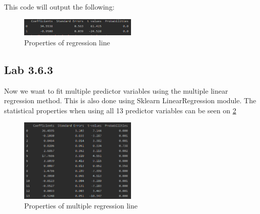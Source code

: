 This code will output the following:

\begin{figure}[H]
	\centering
	\includegraphics[width=0.5\textwidth]{Img/lab1_output.PNG}
	\caption{Properties of regression line}
	\label{fig:lab1_1}
\end{figure} 



\subsection{Lab 3.6.3}
Now we want to fit multiple predictor variables using the multiple linear regression method. This is also done using Sklearn LinearRegression module. The statistical properties when using all 13 predictor variables can be seen on \cref{fig:lab1_2}

\begin{figure}[H]
	\centering
	\includegraphics[width=0.5\textwidth]{Img/lab12_output.PNG}
	\caption{Properties of multiple regression line}
	\label{fig:lab1_2}
\end{figure} 

